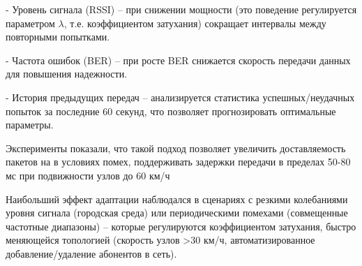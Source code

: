     - Уровень сигнала (RSSI) – при снижении мощности (это поведение регулируется параметром $\lambda$, т.е. коэффициентом затухания) 
    сокращает интервалы между повторными попытками.

    - Частота ошибок (BER) – при росте BER снижается скорость передачи данных для повышения надежности.

    - История предыдущих передач – анализируется статистика успешных/неудачных попыток за последние 60 секунд, что позволяет 
    прогнозировать оптимальные параметры.

Эксперименты показали, что такой подход позволяет увеличить доставляемость пакетов на в условиях помех, поддерживать задержки передачи в пределах 50-80 мс при подвижности узлов до 60 км/ч

Наибольший эффект адаптации наблюдался в сценариях с резкими колебаниями уровня сигнала (городская среда) или периодическими помехами 
(совмещенные частотные диапазоны) -- которые регулируются коэффициентом затухания, быстро меняющейся топологией 
(скорость узлов >30 км/ч, автоматизированное добавление/удаление абонентов в сеть).


%

